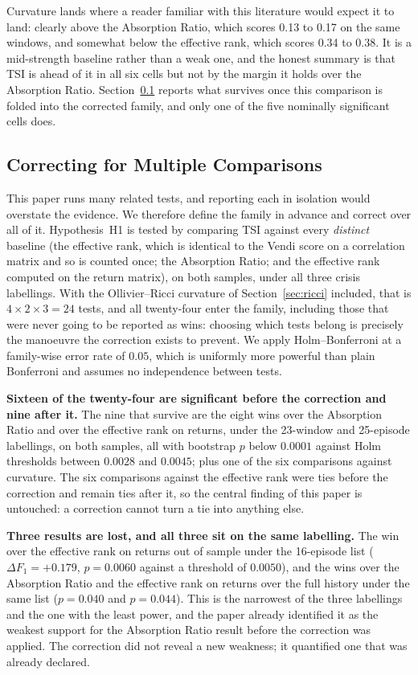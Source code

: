 \documentclass[11pt,a4paper]{article}
\begin{document}
Curvature lands where a reader familiar with this literature would expect it to
land: clearly above the Absorption Ratio, which scores 0.13 to 0.17 on the same
windows, and somewhat below the effective rank, which scores 0.34 to 0.38. It
is a mid-strength baseline rather than a weak one, and the honest summary is
that TSI is ahead of it in all six cells but not by the margin it holds
over the Absorption Ratio. Section~\ref{sec:multiplicity} reports what survives
once this comparison is folded into the corrected family, and only one of the
five nominally significant cells does.

\subsection{Correcting for Multiple Comparisons}
\label{sec:multiplicity}

This paper runs many related tests, and reporting each in isolation would
overstate the evidence. We therefore define the family in advance and correct
over all of it. Hypothesis~H1 is tested by comparing TSI against every
\emph{distinct} baseline (the effective rank, which is identical to the Vendi
score on a correlation matrix and so is counted once; the Absorption Ratio; and
the effective rank computed on the return matrix), on both samples, under all
three crisis labellings. With the Ollivier--Ricci curvature of
Section~\ref{sec:ricci} included, that is $4 \times 2 \times 3 = 24$ tests, and
all twenty-four enter the family, including those that were never going to be reported
as wins: choosing which tests belong is precisely the manoeuvre the correction
exists to prevent. We apply Holm--Bonferroni at a family-wise error rate of
$0.05$, which is uniformly more powerful than plain Bonferroni and assumes no
independence between tests.

\textbf{Sixteen of the twenty-four are significant before the correction and
nine after it.} The nine that survive are the eight wins over the Absorption
Ratio and over the effective rank on returns, under the 23-window and
25-episode labellings, on both samples, all with bootstrap $p$ below $0.0001$
against Holm thresholds between $0.0028$ and $0.0045$; plus one of the six
comparisons against curvature. The six comparisons against the
effective rank were ties before the correction and remain ties after it, so the
central finding of this paper is untouched: a correction cannot turn a tie into
anything else.

\textbf{Three results are lost, and all three sit on the same labelling.} The
win over the effective rank on returns out of sample under the 16-episode list
($\Delta F_1 = +0.179$, $p = 0.0060$ against a threshold of $0.0050$), and the
wins over the Absorption Ratio and the effective rank on returns over the full
history under the same list ($p = 0.040$ and $p = 0.044$). This is the
narrowest of the three labellings and the one with the least power, and the
paper already identified it as the weakest support for the Absorption Ratio
result before the correction was applied. The correction did not reveal a new
weakness; it quantified one that was already declared.
\end{document}
